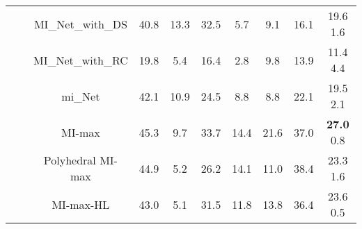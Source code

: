\documentclass[preprint]{elsarticle}
\newcommand\MILS{MI-max}
\newcommand\mimaxaddlayerS{MI-max-HL}
\newcommand\MaxOfMaxS{Polyhedral MI-max}
\begin{document}
\begin{savenotes}
\begin{table*}[h]
{\begin{tabular}{|c|c|c|cccccc|c|}
 & & MI\_Net\_with\_DS \citep{wang_revisiting_2018}  & 40.8  & 13.3  & 32.5  & 5.7  & 9.1  & 16.1  & 19.6    1.6   \\  
& &   MI\_Net\_with\_RC \citep{wang_revisiting_2018}&  19.8  & 5.4  & 16.4  & 2.8  & 9.8  & 13.9  & 11.4    4.4   \\   
 & & mi\_Net \citep{wang_revisiting_2018} & 42.1  & 10.9  & 24.5  & 8.8  & 8.8  & 22.1  & 19.5    2.1   \\
 \cline{3-10}
& & \MILS{} & 45.3  & 9.7  & 33.7  & 14.4  & 21.6  & 37.0  & {\color{red} \bf 27.0 }   0.8  \\ 
& &  \MaxOfMaxS{} & 44.9  & 5.2  & 26.2  & 14.1  & 11.0  & 38.4  & 23.3    1.6    \\ 
& & \mimaxaddlayerS{} & 43.0  & 5.1  & 31.5  & 11.8  & 13.8  & 36.4  & 23.6    0.5   \\
\hline
\end{tabular}
}
\end{table*}
\end{savenotes}
\end{document}
